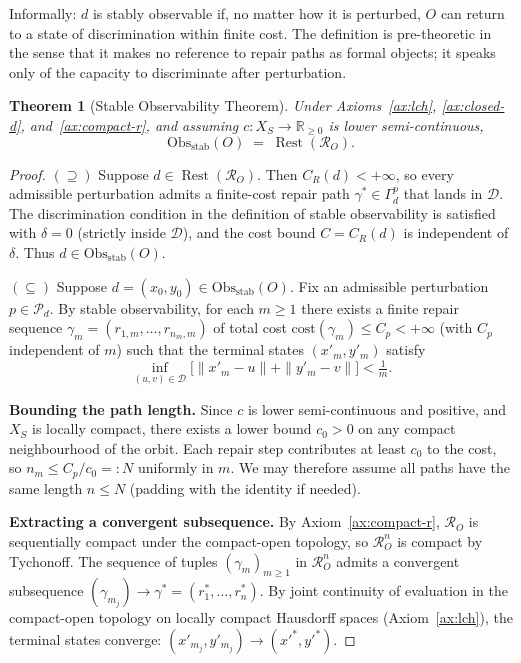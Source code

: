 \documentclass[12pt, oneside]{article}
\theoremstyle{plain}
\newtheorem{theorem}{Theorem}[section]
\theoremstyle{definition}
\theoremstyle{remark}
\theoremstyle{definition}
\DeclareMathOperator{\Rest}{Rest}
\newcommand{\ObsStab}{\mathrm{Obs}_{\mathrm{stab}}}
\newcommand{\CR}{C_{\!R}}
\newcommand{\Xsub}{X_S}
\newcommand{\Psub}{\mathcal{P}}
\newcommand{\Dsub}{\mathcal{D}}
\begin{document}
Informally: $d$ is stably observable if, no matter how it is
perturbed, $O$ can return to a state of discrimination within finite
cost.
The definition is pre-theoretic in the sense that it makes no
reference to repair paths as formal objects; it speaks only of the
capacity to discriminate after perturbation.

\begin{theorem}[Stable Observability Theorem]
  Under Axioms~\ref{ax:lch}, \ref{ax:closed-d}, and~\ref{ax:compact-r},
  and assuming $c : \Xsub \to \mathbb{R}_{\geq 0}$ is lower
  semi-continuous,
  \[
    \ObsStab(O) \;=\; \Rest(\mathcal{R}_O).
  \]
  \label{thm:stable-obs}
\end{theorem}

\begin{proof}
  $(\supseteq)$\;
  Suppose $d \in \Rest(\mathcal{R}_O)$.
  Then $\CR(d) < +\infty$, so every admissible perturbation
  admits a finite-cost repair path $\gamma^* \in \Gamma_d^p$ that
  lands in $\Dsub$.
  The discrimination condition in the definition of stable
  observability is satisfied with $\delta = 0$ (strictly inside
  $\Dsub$), and the cost bound $C = \CR(d)$ is independent of
  $\delta$.
  Thus $d \in \ObsStab(O)$.

  $(\subseteq)$\;
  Suppose $d = (x_0, y_0) \in \ObsStab(O)$.
  Fix an admissible perturbation $p \in \Psub_d$.
  By stable observability, for each $m \geq 1$ there exists a finite
  repair sequence $\gamma_m = (r_{1,m}, \ldots, r_{n_m, m})$ of
  total cost $\mathrm{cost}(\gamma_m) \leq C_p < +\infty$ (with $C_p$
  independent of $m$) such that the terminal states
  $(x'_m, y'_m)$ satisfy
  \[
    \inf_{(u,v) \in \Dsub}
    \bigl[\|x'_m - u\| + \|y'_m - v\|\bigr]
    < \tfrac{1}{m}.
  \]

  \textbf{Bounding the path length.}\;
  Since $c$ is lower semi-continuous and positive, and $\Xsub$ is
  locally compact, there exists a lower bound $c_0 > 0$ on any compact
  neighbourhood of the orbit.
  Each repair step contributes at least $c_0$ to the cost, so
  $n_m \leq C_p / c_0 =: N$ uniformly in $m$.
  We may therefore assume all paths have the same length $n \leq N$
  (padding with the identity if needed).

  \textbf{Extracting a convergent subsequence.}\;
  By Axiom~\ref{ax:compact-r}, $\mathcal{R}_O$ is sequentially compact
  under the compact-open topology, so $\mathcal{R}_O^n$ is compact by
  Tychonoff.
  The sequence of tuples $(\gamma_m)_{m \geq 1}$ in $\mathcal{R}_O^n$
  admits a convergent subsequence
  $(\gamma_{m_j}) \to \gamma^* = (r_1^*, \ldots, r_n^*)$.
  By joint continuity of evaluation in the compact-open topology on
  locally compact Hausdorff spaces (Axiom~\ref{ax:lch}), the terminal
  states converge:
  $(x'_{m_j}, y'_{m_j}) \to (x'^*, y'^*)$.


\end{proof}
\end{document}
